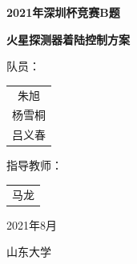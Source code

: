 \documentclass[hyperref,a4paper,UTF8]{ctexart}
\begin{document}
\begin{titlepage}
    \vspace*{\fill}
    \begin{center}
        \normalfont

        {\Huge\bfseries 2021\mbox{年深圳杯竞赛}B\mbox{题}}

        \bigskip
        {\Huge\bfseries 火星探测器着陆控制方案}


        \bigskip
        \bigskip
        \bigskip
        \bigskip
        \bigskip
        \bigskip
        \linespread{1.3}\selectfont
        {\Large\heiti 队员：}
        \Large\kaishu
        \begin{tabular}[t]{@{}c}
            朱旭 \\杨雪桐\\吕义春
        \end{tabular}

        \medskip
        {\Large\heiti 指导教师：}
        \Large\kaishu
        \begin{tabular}[t]{@{}c}
            马龙
        \end{tabular}

        \medskip
        \bigskip
        \bigskip
        \normalfont
        2021年8月
    \end{center}
    \begin{center}
        山东大学
    \end{center}
\end{titlepage}
\end{document}
